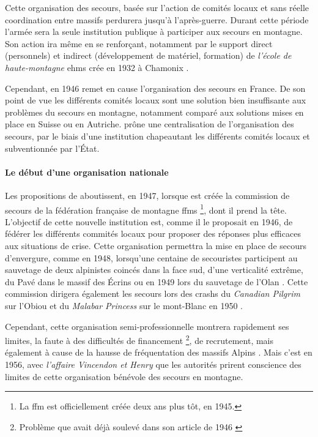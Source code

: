 Cette organisation des secours, basée sur l'action de comités locaux
et sans réelle coordination entre massifs perdurera jusqu'à
l'après-guerre. Durant cette période l'armée sera la seule institution
publique à participer aux secours en montagne. Son action ira même en
se renforçant, notamment par le support direct (personnels) et
indirect (développement de matériel, formation) de \emph{l'école de
  haute-montagne} \acp{ehm} crée en 1932 à Chamonix
\autocite{Mezin2016}.

Cependant, en 1946 \textcite{Devies1946} remet en cause l'organisation
des secours en France. De son point de vue les différents comités
locaux sont une solution bien insuffisante aux problèmes du secours en
montagne, notamment comparé aux solutions mises en place en Suisse ou
en Autriche.  prône une centralisation de l'organisation
des secours, par le biais d'une institution chapeautant les différents
comités locaux et subventionnée par l'État.

\paragraph{Le début d'une organisation nationale}

Les propositions de  aboutissent, en 1947, lorsque est
créée la commission de secours de la fédération française de montagne
\acp{ffm} \footnote{La \ac{ffm} est officiellement créée deux ans plus
  tôt, en 1945.}, dont il prend la tête. L'objectif de cette nouvelle
institution est, comme il le proposait en 1946, de fédérer les
différents commités locaux pour proposer des réponses plus efficaces
aux situations de crise. Cette organisation permettra la mise en place
de secours d'envergure, comme en 1948, lorsqu'une centaine de
secouristes participent au sauvetage de deux alpinistes coincés dans
la face sud, d'une verticalité extrême, du Pavé dans le massif des
Écrins \autocite{Romanaz2018} ou en 1949 lors du sauvetage de l'Olan
\autocite{Mollaret1993}. Cette commission dirigera également les
secours lors des crashs du \emph{Canadian Pilgrim} sur l'Obiou et du
\emph{Malabar Princess} sur le mont-Blanc en 1950
\autocite{CFDLD,Mollaret1993,SDSM2013}.

Cependant, cette organisation semi-professionnelle montrera rapidement
ses limites, la faute à des difficultés de financement
\footnote{Problème que  avait déjà soulevé dans son
  article de 1946 \autocite{Devies1946}}, de recrutement, mais
également à cause de la hausse de fréquentation des massifs Alpins
\autocite{CFDLD}. Mais c'est en 1956, avec \emph{l'affaire Vincendon
  et Henry} que les autorités prirent conscience des limites de cette
organisation bénévole des secours en montagne.

